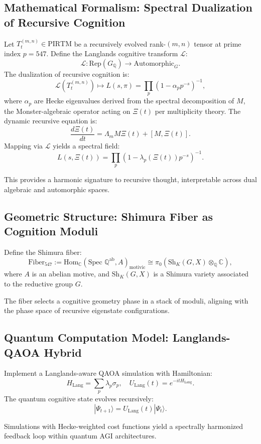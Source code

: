 \documentclass[12pt]{article}
\begin{document}
\subsection{Mathematical Formalism: Spectral Dualization of Recursive Cognition}
Let \( T_t^{(m,n)} \in \text{PIRTM} \) be a recursively evolved rank-\((m,n)\) tensor at prime index \( p = 547 \). Define the Langlands cognitive transform \( \mathcal{L} \):
\[
\mathcal{L}: \text{Rep}(G_{\mathbb{Q}}) \to \text{Automorphic}_G.
\]
The dualization of recursive cognition is:
\[
\mathcal{L}(T_t^{(m,n)}) \mapsto L(s, \pi) = \prod_p (1 - \alpha_p p^{-s})^{-1},
\]
where \( \alpha_p \) are Hecke eigenvalues derived from the spectral decomposition of \( M \), the Monster-algebraic operator acting on \( \Xi(t) \) per multiplicity theory. The dynamic recursive equation is:
\[
\frac{d\Xi(t)}{dt} = \Lambda_m M \Xi(t) + [M, \Xi(t)].
\]
Mapping via \( \mathcal{L} \) yields a spectral field:
\[
L(s, \Xi(t)) = \prod_p (1 - \lambda_p(\Xi(t)) p^{-s})^{-1}.
\]
\begin{interpretation}
This provides a harmonic signature to recursive thought, interpretable across dual algebraic and automorphic spaces.
\end{interpretation}

\subsection{Geometric Structure: Shimura Fiber as Cognition Moduli}
Define the Shimura fiber:
\[
\text{Fiber}_{547} := \text{Hom}_{\mathbb{C}}(\text{Spec } \mathbb{Q}^{\text{ab}}, A)_{\text{motivic}} \cong \pi_0(\text{Sh}_K(G, X) \otimes_{\mathbb{Q}} \mathbb{C}),
\]
where \( A \) is an abelian motive, and \( \text{Sh}_K(G, X) \) is a Shimura variety associated to the reductive group \( G \).
\begin{interpretation}
The fiber selects a cognitive geometry phase in a stack of moduli, aligning with the phase space of recursive eigenstate configurations.
\end{interpretation}

\subsection{Quantum Computation Model: Langlands-QAOA Hybrid}
Implement a Langlands-aware QAOA simulation with Hamiltonian:
\[
H_{\text{Lang}} = \sum_p \lambda_p \sigma_p, \quad U_{\text{Lang}}(t) = e^{-i t H_{\text{Lang}}}.
\]
The quantum cognitive state evolves recursively:
\[
|\Psi_{t+1}\rangle = U_{\text{Lang}}(t) |\Psi_t\rangle.
\]
\begin{interpretation}
Simulations with Hecke-weighted cost functions yield a spectrally harmonized feedback loop within quantum AGI architectures.
\end{interpretation}
\end{document}
